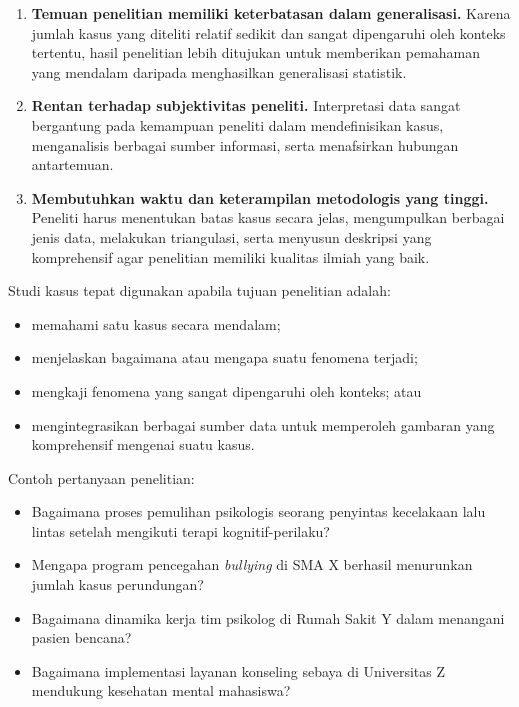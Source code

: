 \documentclass[
  indonesian,
  letterpaper,
  DIV=11,
  numbers=noendperiod]{scrreprt}
\providecommand{\tightlist}{%
  \setlength{\itemsep}{0pt}\setlength{\parskip}{0pt}}
\begin{document}
\begin{enumerate}
\def\labelenumi{\arabic{enumi}.}
\tightlist
\item
  \textbf{Temuan penelitian memiliki keterbatasan dalam generalisasi.}
  Karena jumlah kasus yang diteliti relatif sedikit dan sangat
  dipengaruhi oleh konteks tertentu, hasil penelitian lebih ditujukan
  untuk memberikan pemahaman yang mendalam daripada menghasilkan
  generalisasi statistik.
\item
  \textbf{Rentan terhadap subjektivitas peneliti.} Interpretasi data
  sangat bergantung pada kemampuan peneliti dalam mendefinisikan kasus,
  menganalisis berbagai sumber informasi, serta menafsirkan hubungan
  antartemuan.
\item
  \textbf{Membutuhkan waktu dan keterampilan metodologis yang tinggi.}
  Peneliti harus menentukan batas kasus secara jelas, mengumpulkan
  berbagai jenis data, melakukan triangulasi, serta menyusun deskripsi
  yang komprehensif agar penelitian memiliki kualitas ilmiah yang baik.
\end{enumerate}

\begin{tcolorbox}[enhanced jigsaw, colframe=quarto-callout-tip-color-frame, toptitle=1mm, breakable, leftrule=.75mm, arc=.35mm, toprule=.15mm, colback=white, colbacktitle=quarto-callout-tip-color!10!white, bottomtitle=1mm, bottomrule=.15mm, titlerule=0mm, title={Kapan menggunakan studi kasus?}, coltitle=black, left=2mm, opacitybacktitle=0.6, opacityback=0, rightrule=.15mm]

Studi kasus tepat digunakan apabila tujuan penelitian adalah:

\begin{itemize}
\tightlist
\item
  memahami satu kasus secara mendalam;
\item
  menjelaskan bagaimana atau mengapa suatu fenomena terjadi;
\item
  mengkaji fenomena yang sangat dipengaruhi oleh konteks; atau
\item
  mengintegrasikan berbagai sumber data untuk memperoleh gambaran yang
  komprehensif mengenai suatu kasus.
\end{itemize}

Contoh pertanyaan penelitian:

\begin{itemize}
\tightlist
\item
  Bagaimana proses pemulihan psikologis seorang penyintas kecelakaan
  lalu lintas setelah mengikuti terapi kognitif-perilaku?
\item
  Mengapa program pencegahan \emph{bullying} di SMA X berhasil
  menurunkan jumlah kasus perundungan?
\item
  Bagaimana dinamika kerja tim psikolog di Rumah Sakit Y dalam menangani
  pasien bencana?
\item
  Bagaimana implementasi layanan konseling sebaya di Universitas Z
  mendukung kesehatan mental mahasiswa?
\end{itemize}

\end{tcolorbox}
\end{document}

